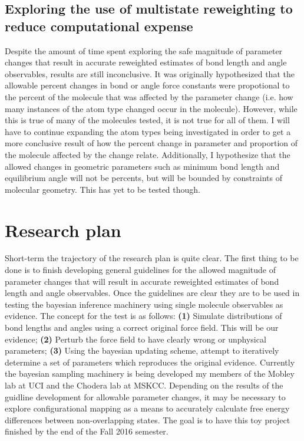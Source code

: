 \documentclass[rmp,nofootinbib,superscriptaddress,12pt,tightenlines,notitlepage]{revtex4-1}
\begin{document}
\subsection{Exploring the use of multistate reweighting to reduce computational expense}
Despite the amount of time spent exploring the safe magnitude of parameter changes that result in accurate reweighted estimates of bond length and angle 
observables, results are still inconclusive. It was originally hypothesized that the allowable percent changes in bond or angle force constants were 
propotional to the percent of the molecule that was affected by the parameter change (i.e. how many instances of the atom type changed occur in the molecule).
However, while this is true of many of the molecules tested, it is not true for all of them. I will have to continue expanding the atom types being 
investigated in order to get a more conclusive result of how the percent change in parameter and proportion of the molecule affected by the change relate. 
Additionally, I hypothesize that the allowed changes in geometric parameters such as minimum bond length and equilibrium angle will not be percents, but will
be bounded by constraints of molecular geometry. This has yet to be tested though. 
\section{Research plan}
Short-term the trajectory of the research plan is quite clear. The first thing to be done is to finish developing general guidelines for the allowed magnitude
of parameter changes that will result in accurate reweighted estimates of bond length and angle observables. Once the guidelines are clear they are to be 
used in testing the bayesian inference machinery using single molecule observables as evidence. The concept for the test is as follows: \textbf{(1)} 
Simulate distributions of bond lengths and angles using a correct original force field. This will be our evidence; \textbf{(2)} Perturb the force field to 
have clearly wrong or unphysical parameters; \textbf{(3)} Using the bayesian updating scheme, attempt to iteratively determine a set of parameters which 
reproduces the original evidence. Currently the bayesian sampling machinery is being developed my members of the Mobley lab at UCI and the Chodera lab 
at MSKCC. Depending on the results of the guidline development for allowable parameter changes, it may be necessary to explore configurational mapping 
as a means to accurately calculate free energy differences between non-overlapping states.\cite{mapping} The goal is to have this toy project 
finished by the end of the Fall 2016 semester. 
\end{document}
